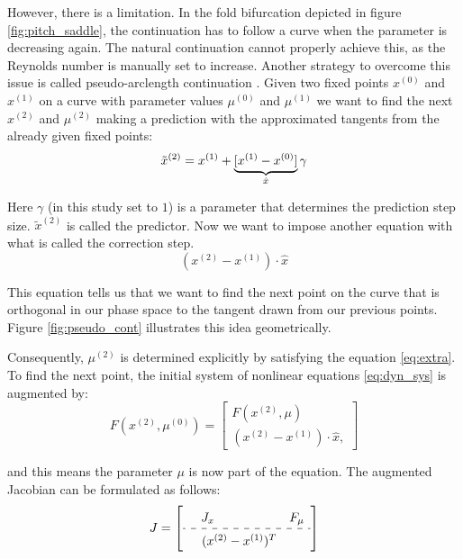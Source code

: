 However, there is a limitation. In the fold bifurcation depicted in figure
\ref{fig:pitch_saddle}, the continuation has to follow a curve when the
parameter is decreasing again. The natural continuation cannot properly achieve
this, as the Reynolds number is manually set to increase. Another strategy to
overcome this issue is called pseudo-arclength continuation
\citep{kuznetsov2004}. Given two fixed points $x^{(0)}$ and $x^{(1)}$ on a
curve with parameter values $\mu^{(0)}$ and $\mu^{(1)}$ we want to find the
next $x^{(2)}$ and $\mu^{(2)}$ making a prediction with the approximated
tangents from the already given fixed points:
\begin{equation}
  \tilde{x}^{(2)} = x^{(1)}  + \underbrace{[x^{(1)} - x^{(0)}]}_{\text{\normalfont $\hat{x}$}} \gamma
\end{equation}

Here $\gamma$ (in this study set to $1$) is a parameter that determines the
prediction step size. $\tilde{x}^{(2)}$ is called the predictor. Now we want to
impose another equation with what is called the correction step.
\begin{equation}
  (x^{(2)} - x^{(1)})  \cdot \hat{x} \label{eq:extra}
\end{equation}

This equation tells us that we want to find the next point on the curve that is
orthogonal in our phase space to the tangent drawn from our previous points.
Figure \ref{fig:pseudo_cont} illustrates this idea geometrically.

Consequently, $\mu^{(2)}$ is determined explicitly by satisfying the equation
\eqref{eq:extra}. To find the next point, the initial system of nonlinear
equations \eqref{eq:dyn_sys} is augmented by:
\begin{equation}
  F(x^{(2)}, \mu^{(0)}) = 
\begin{bmatrix} F(x^{(2)}, \mu) \\ (x^{(2)} - x^{(1)})  \cdot \hat{x},
\end{bmatrix} \label{eq:dyn_sys_cont}
\end{equation}

and this means the parameter $\mu$ is now part of the equation. The augmented
Jacobian can be formulated as follows: 
\begin{equation}
\renewcommand\arraystretch{1.5}
J = 
\left[
\begin{array}{cc}
  J_x \quad \quad \quad \quad & F_{\mu} \\
  \hdashline
  \quad (x^{(2)} - x^{(1)})^T
\end{array} \label{eq:jac_aug}
\right]
\end{equation}

